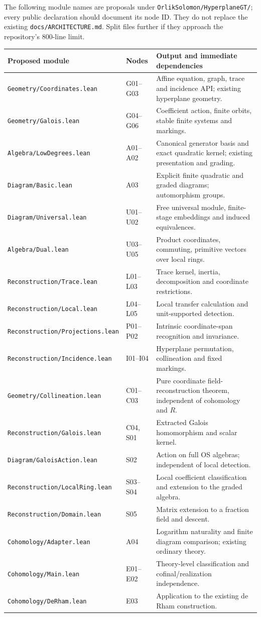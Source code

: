 \documentclass[11pt]{article}
\theoremstyle{remark}\newtheorem{remark}[theorem]{Remark}
\newcommand{\code}[1]{\nolinkurl{#1}}
\begin{document}
The following module names are proposals under
\code{OrlikSolomon/HyperplaneGT/}; every public declaration should
document its node ID. They do not replace the existing
\code{docs/ARCHITECTURE.md}. Split files further if they approach
the repository's 800-line limit.
\small
\begin{longtable}{@{}p{}p{}p{}@{}}
\toprule Proposed module & Nodes & Output and immediate dependencies\\\midrule\endhead
\code{Geometry/Coordinates.lean}&G01--G03&Affine equation, graph, trace and incidence API; existing hyperplane geometry.\\
\code{Geometry/Galois.lean}&G04--G06&Coefficient action, finite orbits, stable finite systems and markings.\\
\code{Algebra/LowDegrees.lean}&A01--A02&Canonical generator basis and exact quadratic kernel; existing presentation and grading.\\
\code{Diagram/Basic.lean}&A03&Explicit finite quadratic and graded diagrams; automorphism groups.\\
\code{Diagram/Universal.lean}&U01--U02&Free universal module, finite-stage embeddings and induced equivalences.\\
\code{Algebra/Dual.lean}&U03--U05&Product coordinates, commuting, primitive vectors over local rings.\\
\code{Reconstruction/Trace.lean}&L01--L03&Trace kernel, inertia, decomposition and coordinate restrictions.\\
\code{Reconstruction/Local.lean}&L04--L05&Local transfer calculation and unit-supported detection.\\
\code{Reconstruction/Projections.lean}&P01--P02&Intrinsic coordinate-span recognition and invariance.\\
\code{Reconstruction/Incidence.lean}&I01--I04&Hyperplane permutation, collineation and fixed markings.\\
\code{Geometry/Collineation.lean}&C01--C03&Pure coordinate field-reconstruction theorem, independent of cohomology and $R$.\\
\code{Reconstruction/Galois.lean}&C04, S01&Extracted Galois homomorphism and scalar kernel.\\
\code{Diagram/GaloisAction.lean}&S02&Action on full OS algebras; independent of local detection.\\
\code{Reconstruction/LocalRing.lean}&S03--S04&Local coefficient classification and extension to the graded algebra.\\
\code{Reconstruction/Domain.lean}&S05&Matrix extension to a fraction field and descent.\\
\code{Cohomology/Adapter.lean}&A04&Logarithm naturality and finite diagram comparison; existing ordinary theory.\\
\code{Cohomology/Main.lean}&E01--E02&Theory-level classification and cofinal/realization independence.\\
\code{Cohomology/DeRham.lean}&E03&Application to the existing de Rham construction.\\\bottomrule
\end{longtable}
\normalsize
\end{document}
